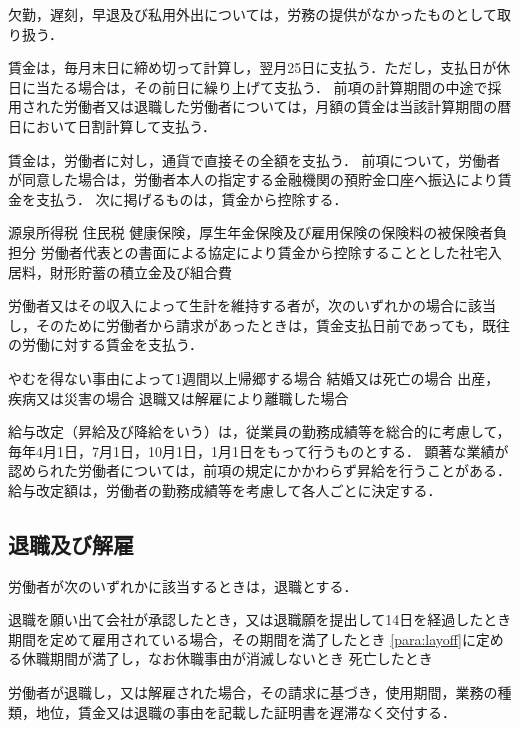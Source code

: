 \documentclass[11pt,a4paper]{jsarticle}
\begin{document}
欠勤，遅刻，早退及び私用外出については，労務の提供がなかったものとして取り扱う．

賃金は，毎月末日に締め切って計算し，翌月25日に支払う．ただし，支払日が休日に当たる場合は，その前日に繰り上げて支払う．
\term
前項の計算期間の中途で採用された労働者又は退職した労働者については，月額の賃金は当該計算期間の暦日において日割計算して支払う．

賃金は，労働者に対し，通貨で直接その全額を支払う．
\term
前項について，労働者が同意した場合は，労働者本人の指定する金融機関の預貯金口座へ振込により賃金を支払う．
\term
次に掲げるものは，賃金から控除する．
\begin{enumerate}
	\itm 源泉所得税
	\itm 住民税
	\itm 健康保険，厚生年金保険及び雇用保険の保険料の被保険者負担分
	\itm 労働者代表との書面による協定により賃金から控除することとした社宅入居料，財形貯蓄の積立金及び組合費
\end{enumerate}

労働者又はその収入によって生計を維持する者が，次のいずれかの場合に該当し，そのために労働者から請求があったときは，賃金支払日前であっても，既往の労働に対する賃金を支払う．
\begin{enumerate}
	\itm やむを得ない事由によって1週間以上帰郷する場合
	\itm 結婚又は死亡の場合
	\itm 出産，疾病又は災害の場合
	\itm 退職又は解雇により離職した場合
\end{enumerate}

給与改定（昇給及び降給をいう）は，従業員の勤務成績等を総合的に考慮して，毎年4月1日，7月1日，10月1日，1月1日をもって行うものとする．
\term
顕著な業績が認められた労働者については，前項の規定にかかわらず昇給を行うことがある．
\term
給与改定額は，労働者の勤務成績等を考慮して各人ごとに決定する．


\subsection{退職及び解雇}

労働者が次のいずれかに該当するときは，退職とする．
\begin{enumerate}
	\itm 退職を願い出て会社が承認したとき，又は退職願を提出して14日を経過したとき
	\itm 期間を定めて雇用されている場合，その期間を満了したとき
	\itm \ref{para:layoff}に定める休職期間が満了し，なお休職事由が消滅しないとき
	\itm 死亡したとき
\end{enumerate}
\term
労働者が退職し，又は解雇された場合，その請求に基づき，使用期間，業務の種類，地位，賃金又は退職の事由を記載した証明書を遅滞なく交付する．
\end{document}
